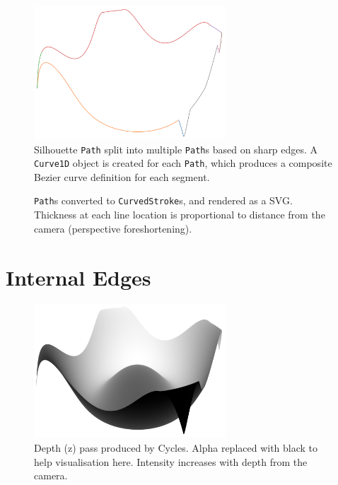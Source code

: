 \begin{figure}[h!]
	\centering
	\includegraphics[height=5cm]{images/sil_split_paths.png}
	\caption{Silhouette \texttt{Path} split into multiple \texttt{Path}s based on sharp edges. A \texttt{Curve1D} object is created for each \texttt{Path}, which produces a composite Bezier curve definition for each segment.}\label{sil_split_paths}
\end{figure}

\begin{figure}[h!]
	\centering
	
	\caption{\texttt{Path}s converted to \texttt{CurvedStroke}s, and rendered as a SVG. Thickness at each line location is proportional to distance from the camera (perspective foreshortening).}\label{sil_obj}
\end{figure}

\FloatBarrier
\section{Internal Edges}\label{impl_internal}
\begin{figure}[h!]
	\centering
	\includegraphics[height=5cm]{images/int_depth.png}
	\caption{Depth (z) pass produced by Cycles. Alpha replaced with black to help visualisation here. Intensity increases with depth from the camera.}\label{int_depth}
\end{figure}

